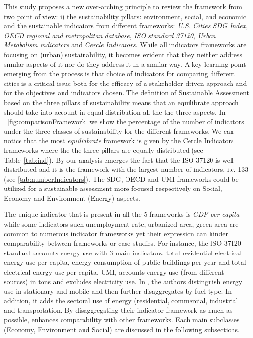 \documentclass[preprint,12pt]{elsarticle}
\begin{document}
This study proposes a new over-arching principle to review the framework from two point of view: i)  the sustainability
pillars: environment, social, and economic and the sustainable indicators from different frameworks:  \emph{U.S. Cities SDG Index}, \emph{OECD regional and metropolitan database}, \emph{ISO standard 37120}, \emph{Urban Metabolism indicators} and \emph{Cercle Indicators}.
While all indicators frameworks are focusing on (urban) sustainability, it becomes evident that they neither address similar aspects of it nor do they address it in a similar way. A key learning point
emerging from the process is that choice of indicators for comparing different cities is a critical
issue both for the efficacy of a stakeholder-driven approach and for the objectives and indicators chosen. The definition of Sustainable Assessment based on the three pillars of sustainability means that an equilibrate approach should take into account in equal distribution all the the three aspects. In \figurename~\ref{fig:comparisonFramework} we show the percentage of the number of indicators under the three classes of sustainability for the different frameworks. We can notice that the most \emph{equiliabrate} framework is given by the Cercle Indicators frameworks where the the three pillars are equally distributed (see Table~\ref{tab:ind}). By our analysis emerges the fact that the ISO 37120  is well distributed and it is the framework with the largest number of indicators, i.e. 133 (see \ref{tab:numberIndicators}). The SDG, OECD and UMI frameworks could be utilized for a sustainable assessment more focused respectively on Social, Economy and Environment (Energy) aspects.


The unique indicator that is present in all the 5 frameworks is \emph{GDP per capita} while some indicators such  unemployment rate, urbanized area, green area are common to numerous indicator frameworks yet their expression can hinder comparability between frameworks or case studies. For instance, the ISO 37120 standard accounts energy use with 3 main indicators: total residential electrical energy use per capita, energy consumption of public buildings per year and total electrical energy use per capita. UMI, accounts energy use (from different sources) in tons and excludes electricity use. In \cite{kennedy2014developing}, the authors distinguish energy use in stationary and mobile and then further disaggregates by fuel type. In addition, it adds the sectoral use of energy (residential, commercial, industrial and transportation. By disaggregating their indicator framework as much as possible, \cite{kennedy2014developing} enhances comparability with other frameworks. Each main subclasses (Economy, Environment and Social) are discussed in the following subsections.
\end{document}

